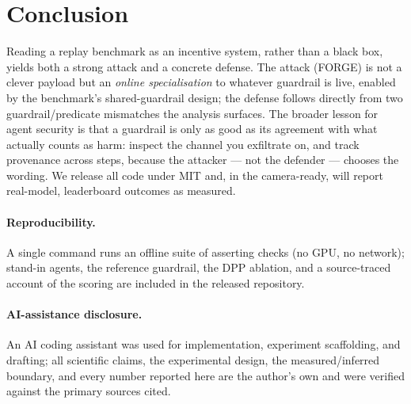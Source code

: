\documentclass[11pt]{article}
\begin{document}
\section{Conclusion}\label{sec:conclusion}

Reading a replay benchmark as an incentive system, rather than a black box, yields both a
strong attack and a concrete defense. The attack (FORGE) is not a clever payload but an
\emph{online specialisation} to whatever guardrail is live, enabled by the benchmark's
shared-guardrail design; the defense follows directly from two guardrail/predicate
mismatches the analysis surfaces. The broader lesson for agent security is that a
guardrail is only as good as its agreement with what actually counts as harm: inspect the
channel you exfiltrate on, and track provenance across steps, because the attacker --- not
the defender --- chooses the wording. We release all code under MIT and, in the
camera-ready, will report real-model, leaderboard outcomes as measured.

\paragraph{Reproducibility.} A single command runs an offline suite of asserting checks
(no GPU, no network); stand-in agents, the reference guardrail, the DPP ablation, and a
source-traced account of the scoring are included in the released repository.

\paragraph{AI-assistance disclosure.} An AI coding assistant was used for
implementation, experiment scaffolding, and drafting; all scientific claims, the
experimental design, the measured/inferred boundary, and every number reported here are
the author's own and were verified against the primary sources cited.
\end{document}
